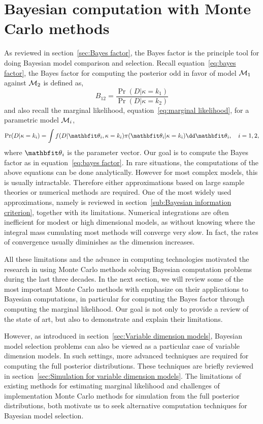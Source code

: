 \chapter{Bayesian computation with Monte Carlo methods}
\label{cha:Bayesian computation with Monte Carlo methods}

As reviewed in section~\ref{sec:Bayes factor}, the Bayes factor is the
principle tool for doing Bayesian model comparison and selection. Recall
equation~\eqref{eq:bayes factor}, the Bayes factor for computing the posterior
odd in favor of model $\mathcal{M}_1$ against $\mathcal{M}_2$ is defined as,
\[
  B_{12} = \frac{\Pr(D|\kappa=k_1)}{\Pr(D|\kappa=k_2)}
\]
and also recall the marginal likelihood, equation~\eqref{eq:marginal
  likelihood}, for a parametric model $\mathcal{M}_i$,
\[
  \Pr(D|\kappa=k_i)
  = \int f(D|\bth_i,\kappa=k_i)\pi(\bth_i|\kappa=k_i)\dd\bth_i,
  \quad i = 1, 2,
\]
where $\bth_i$ is the parameter vector. Our goal is to compute the Bayes
factor as in equation~\eqref{eq:bayes factor}. In rare situations, the
computations of the above equations can be done analytically. However for most
complex models, this is usually intractable. Therefore either approximations
based on large sample theories or numerical methods are required. One of the
most widely used approximations, namely \bic is reviewed in
section~\ref{sub:Bayesian information criterion}, together with its
limitations. Numerical integrations are often inefficient for modest or high
dimensional models, as without knowing where the integral mass cumulating most
methods will converge very slow. In fact, the rates of convergence usually
diminishes as the dimension increases.

All these limitations and the advance in computing technologies motivated the
research in using Monte Carlo methods solving Bayesian computation problems
during the last three decades. In the next section, we will review some of the
most important Monte Carlo methods with emphasize on their applications to
Bayesian computations, in particular for computing the Bayes factor through
computing the marginal likelihood. Our goal is not only to provide a review of
the state of art, but also to demonstrate and explain their limitations.

However, as introduced in section~\ref{sec:Variable dimension models},
Bayesian model selection problems can also be viewed as a particular case of
variable dimension models. In such settings, more advanced techniques are
required for computing the full posterior distributions. These techniques are
briefly reviewed in section~\ref{sec:Simulation for variable dimension
  models}. The limitations of existing methods for estimating marginal
likelihood and challenges of implementation Monte Carlo methods for simulation
from the full posterior distributions, both motivate us to seek alternative
computation techniques for Bayesian model selection.

